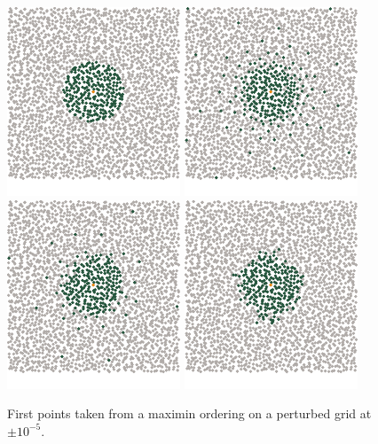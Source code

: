 \documentclass[review,supplement,onefignum,onetabnum]{siamonline220329}
\begin{document}
\begin{figure}[H]
  \centering
  \includegraphics{figures/precompiled/maximin_1e-5/points_1.pdf}%
  \quad
  \includegraphics{figures/precompiled/maximin_1e-5/points_2.pdf}%
  \quad
  \includegraphics{figures/precompiled/maximin_1e-5/points_3.pdf}%
  \quad
  \includegraphics{figures/precompiled/maximin_1e-5/points_4.pdf}%
  \caption{
    First points taken from a maximin ordering
    on a perturbed grid at \( \pm 10^{-5} \).
  }
\end{figure}
\end{document}
